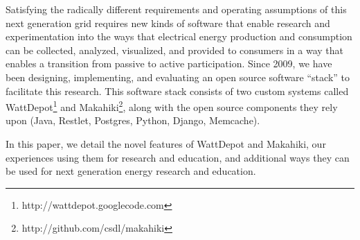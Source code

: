 Satisfying the radically different requirements and operating assumptions of this next generation grid requires new kinds of software that enable research and experimentation into the ways that electrical energy production and consumption can be collected, analyzed, visualized, and provided to consumers in a way that enables a transition from passive to active participation.  Since 2009, we have been designing, implementing, and evaluating an open source software ``stack'' to facilitate this research.  This software stack consists of two custom systems called WattDepot\footnote{http://wattdepot.googlecode.com} and Makahiki\footnote{http://github.com/csdl/makahiki}, along with the open source components they rely upon (Java, Restlet, Postgres, Python, Django, Memcache).

In this paper, we detail the novel features of WattDepot and Makahiki, our experiences using them for research and education, and additional ways they can be used for next generation energy research and education.
